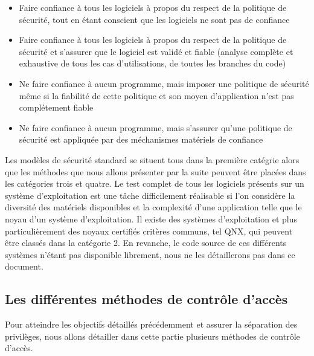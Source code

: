 \begin{itemize}
  \item Faire confiance à tous les logiciels à propos du respect de la politique de sécurité, tout en étant conscient que les logiciels ne sont pas de confiance %
  \item Faire confiance à tous les logiciels à propos du respect de la politique de sécurité et s'assurer que le logiciel est validé et fiable (analyse complète et exhaustive de tous les cas d'utilisations, de toutes les branches du code) %
  \item Ne faire confiance à aucun programme, mais imposer une politique de sécurité même si la fiabilité de cette politique et son moyen d'application n'est pas complétement fiable%
  \item Ne faire confiance à aucun programme, mais s'assurer qu'une politique de sécurité est appliquée par des méchanismes matériels de confiance%
\end{itemize}

Les modèles de sécurité standard se situent tous dans la première catégrie alors que les méthodes que nous allons présenter par la suite peuvent être placées dans les catégories trois et quatre. Le test complet de tous les logiciels présents sur un système d'exploitation est une tâche difficilement réalisable si l'on considère la diversité des matériels disponibles et la complexité d'une application telle que le noyau d'un système d'exploitation. Il existe des systèmes d'exploitation et plus particulièrement des noyaux certifiés critères communs, tel QNX\cite{QNX}, qui peuvent être classés dans la catégorie 2. En revanche, le code source de ces différents systèmes n'étant pas disponible librement, nous ne les détaillerons pas dans ce document.

\subsection{Les différentes méthodes de contrôle d'accès}

Pour atteindre les objectifs détaillés précédemment et assurer la séparation des privilèges, nous allons détailler dans cette partie plusieurs méthodes de contrôle d'accès.

